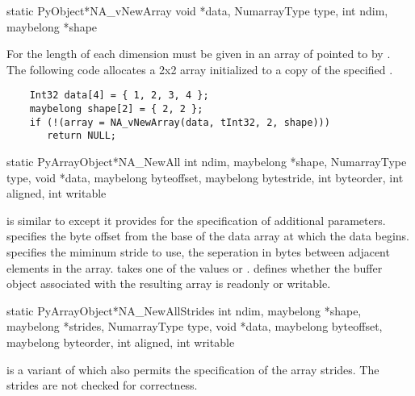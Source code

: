 \begin{cfuncdesc}{static PyObject*}{NA_vNewArray}{%
    void *data, NumarrayType type, int ndim, maybelong *shape}%

  For  the length of each dimension must be given in an
  array of  pointed to by . The following code
  allocates a 2x2 array initialized to a copy of the specified .
  \begin{verbatim}
    Int32 data[4] = { 1, 2, 3, 4 };
    maybelong shape[2] = { 2, 2 };
    if (!(array = NA_vNewArray(data, tInt32, 2, shape)))
       return NULL;
  \end{verbatim}
\end{cfuncdesc}

\begin{cfuncdesc}{static PyArrayObject*}{NA_NewAll}{%
    int ndim, maybelong *shape, NumarrayType type, void *data, maybelong
    byteoffset, maybelong bytestride, int byteorder, int aligned, int
    writable}%

     is similar to  except it
    provides for the specification of additional parameters. 
    specifies the byte offset from the base of the data array at which the
     data begins.   specifies the miminum stride to
    use, the seperation in bytes between adjacent elements in the
    array.  takes one of the values  or
    .   defines whether the buffer
    object associated with the resulting array is readonly or writable.
\end{cfuncdesc}

\begin{cfuncdesc}{static PyArrayObject*}{NA_NewAllStrides}{%
    int ndim, maybelong *shape, maybelong *strides, NumarrayType type, void
    *data, maybelong byteoffset, maybelong byteorder, int aligned, int
    writable}%

     is a variant of  which
    also permits the specification of the array strides.  The strides are not
    checked for correctness.
\end{cfuncdesc}

